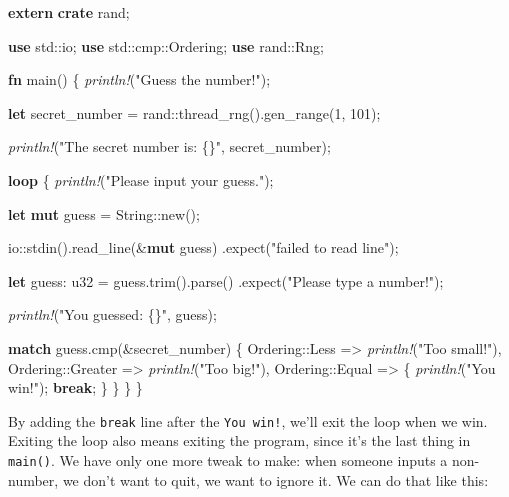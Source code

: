 \documentclass[a4paper,]{book}
\newenvironment{Shaded}{\begin{snugshade}}{\end{snugshade}}
\newcommand{\KeywordTok}[1]{\textcolor[rgb]{0.13,0.29,0.53}{\textbf{{#1}}}}
\newcommand{\DataTypeTok}[1]{\textcolor[rgb]{0.13,0.29,0.53}{{#1}}}
\newcommand{\DecValTok}[1]{\textcolor[rgb]{0.00,0.00,0.81}{{#1}}}
\newcommand{\StringTok}[1]{\textcolor[rgb]{0.31,0.60,0.02}{{#1}}}
\newcommand{\PreprocessorTok}[1]{\textcolor[rgb]{0.56,0.35,0.01}{\textit{{#1}}}}
\newcommand{\NormalTok}[1]{{#1}}
\begin{document}
\begin{Shaded}
\begin{Highlighting}[]
\KeywordTok{extern} \KeywordTok{crate} \NormalTok{rand;}

\KeywordTok{use} \NormalTok{std::io;}
\KeywordTok{use} \NormalTok{std::cmp::Ordering;}
\KeywordTok{use} \NormalTok{rand::Rng;}

\KeywordTok{fn} \NormalTok{main() \{}
    \PreprocessorTok{println!}\NormalTok{(}\StringTok{"Guess the number!"}\NormalTok{);}

    \KeywordTok{let} \NormalTok{secret_number = rand::thread_rng().gen_range(}\DecValTok{1}\NormalTok{, }\DecValTok{101}\NormalTok{);}

    \PreprocessorTok{println!}\NormalTok{(}\StringTok{"The secret number is: \{\}"}\NormalTok{, secret_number);}

    \KeywordTok{loop} \NormalTok{\{}
        \PreprocessorTok{println!}\NormalTok{(}\StringTok{"Please input your guess."}\NormalTok{);}

        \KeywordTok{let} \KeywordTok{mut} \NormalTok{guess = }\DataTypeTok{String}\NormalTok{::new();}

        \NormalTok{io::stdin().read_line(&}\KeywordTok{mut} \NormalTok{guess)}
            \NormalTok{.expect(}\StringTok{"failed to read line"}\NormalTok{);}

        \KeywordTok{let} \NormalTok{guess: }\DataTypeTok{u32} \NormalTok{= guess.trim().parse()}
            \NormalTok{.expect(}\StringTok{"Please type a number!"}\NormalTok{);}

        \PreprocessorTok{println!}\NormalTok{(}\StringTok{"You guessed: \{\}"}\NormalTok{, guess);}

        \KeywordTok{match} \NormalTok{guess.cmp(&secret_number) \{}
            \NormalTok{Ordering::Less    => }\PreprocessorTok{println!}\NormalTok{(}\StringTok{"Too small!"}\NormalTok{),}
            \NormalTok{Ordering::Greater => }\PreprocessorTok{println!}\NormalTok{(}\StringTok{"Too big!"}\NormalTok{),}
            \NormalTok{Ordering::Equal   => \{}
                \PreprocessorTok{println!}\NormalTok{(}\StringTok{"You win!"}\NormalTok{);}
                \KeywordTok{break}\NormalTok{;}
            \NormalTok{\}}
        \NormalTok{\}}
    \NormalTok{\}}
\NormalTok{\}}
\end{Highlighting}
\end{Shaded}

By adding the \texttt{break} line after the \texttt{You\ win!}, we'll
exit the loop when we win. Exiting the loop also means exiting the
program, since it's the last thing in \texttt{main()}. We have only one
more tweak to make: when someone inputs a non-number, we don't want to
quit, we want to ignore it. We can do that like this:
\end{document}
